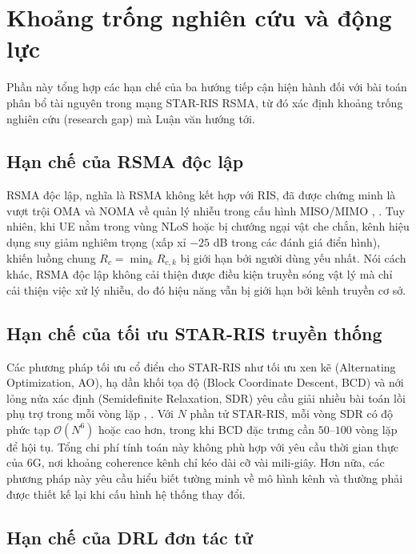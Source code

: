 \section{Khoảng trống nghiên cứu và động lực}
\label{sec:research_gap}

Phần này tổng hợp các hạn chế của ba hướng tiếp cận hiện hành đối với
bài toán phân bổ tài nguyên trong mạng STAR-RIS RSMA, từ đó xác định
khoảng trống nghiên cứu (research gap) mà Luận văn hướng tới.

\subsection{Hạn chế của RSMA độc lập}

RSMA độc lập, nghĩa là RSMA không kết hợp với RIS, đã được chứng minh
là vượt trội OMA và NOMA về quản lý nhiễu trong cấu hình MISO/MIMO
\cite{mao2018rsma}, \cite{mao2022rsma}. Tuy nhiên, khi UE nằm trong vùng
NLoS hoặc bị chướng ngại vật che chắn, kênh hiệu dụng suy giảm nghiêm
trọng (xấp xỉ $-25$ dB trong các đánh giá điển hình), khiến luồng chung
$R_c = \min_k R_{c,k}$ bị giới hạn bởi người dùng yếu nhất. Nói cách
khác, RSMA độc lập không cải thiện được điều kiện truyền sóng vật lý
mà chỉ cải thiện việc xử lý nhiễu, do đó hiệu năng vẫn bị giới hạn bởi
kênh truyền cơ sở.

\subsection{Hạn chế của tối ưu STAR-RIS truyền thống}

Các phương pháp tối ưu cổ điển cho STAR-RIS như tối ưu xen kẽ
(Alternating Optimization, AO), hạ dần khối tọa độ (Block Coordinate
Descent, BCD) và nới lỏng nửa xác định (Semidefinite Relaxation, SDR)
yêu cầu giải nhiều bài toán lồi phụ trợ trong mỗi vòng lặp
\cite{wu2020smart}, \cite{soleymani2024starris}. Với $N$ phần tử
STAR-RIS, mỗi vòng SDR có độ phức tạp $\mathcal{O}(N^6)$ hoặc cao hơn,
trong khi BCD đặc trưng cần $50$--$100$ vòng lặp để hội tụ. Tổng chi
phí tính toán này không phù hợp với yêu cầu thời gian thực của 6G, nơi
khoảng coherence kênh chỉ kéo dài cỡ vài mili-giây. Hơn nữa, các phương
pháp này yêu cầu hiểu biết tường minh về mô hình kênh và thường phải
được thiết kế lại khi cấu hình hệ thống thay đổi.

\subsection{Hạn chế của DRL đơn tác tử}

